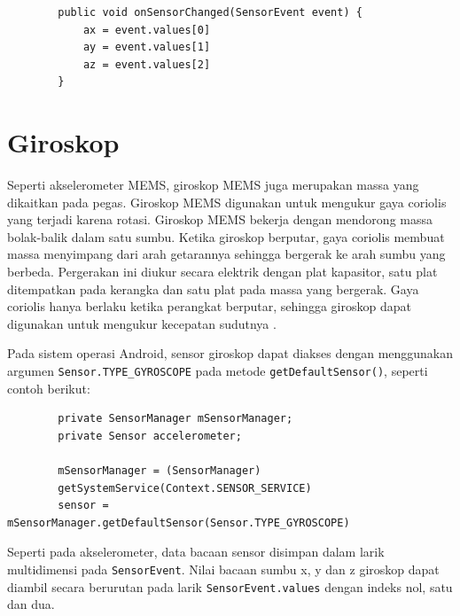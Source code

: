 \begin{listing}[h]
    \begin{verbatim}
        public void onSensorChanged(SensorEvent event) {
            ax = event.values[0]
            ay = event.values[1]
            az = event.values[2]
        }
    \end{verbatim}
\end{listing}



\section{Giroskop}
Seperti akselerometer MEMS, giroskop MEMS juga merupakan massa yang dikaitkan pada pegas. Giroskop MEMS digunakan untuk mengukur gaya coriolis yang terjadi karena rotasi. Giroskop MEMS bekerja dengan mendorong massa bolak-balik dalam satu sumbu. Ketika giroskop berputar, gaya coriolis membuat massa menyimpang dari arah getarannya sehingga bergerak ke arah sumbu yang berbeda. Pergerakan ini diukur secara elektrik dengan plat kapasitor, satu plat ditempatkan pada kerangka dan satu plat pada massa yang bergerak. Gaya coriolis hanya berlaku ketika perangkat berputar, sehingga giroskop dapat digunakan untuk mengukur kecepatan sudutnya \citep{milette-2012}.

Pada sistem operasi Android, sensor giroskop dapat diakses dengan menggunakan argumen \texttt{Sensor.TYPE_GYROSCOPE} pada metode \texttt{getDefaultSensor()}, seperti contoh berikut:

\begin{listing}[h]
    \begin{verbatim}
        private SensorManager mSensorManager;
        private Sensor accelerometer;

        mSensorManager = (SensorManager)
        getSystemService(Context.SENSOR_SERVICE)
        sensor = mSensorManager.getDefaultSensor(Sensor.TYPE_GYROSCOPE)
    \end{verbatim}
\end{listing}

Seperti pada akselerometer, data bacaan sensor disimpan dalam larik multidimensi pada \texttt{SensorEvent}. Nilai bacaan sumbu x, y dan z giroskop dapat diambil secara berurutan pada larik \texttt{SensorEvent.values} dengan indeks nol, satu dan dua.


